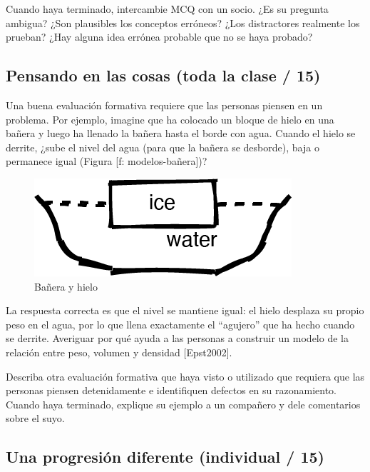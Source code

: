 \documentclass[
]{book}
\begin{document}
Cuando haya terminado, intercambie MCQ con un socio. ¿Es su pregunta ambigua? ¿Son plausibles los conceptos erróneos? ¿Los distractores realmente los prueban? ¿Hay alguna idea errónea probable que no se haya probado?

\hypertarget{pensando-en-las-cosas-toda-la-clase-15}{%
\subsection{Pensando en las cosas (toda la clase / 15)}\label{pensando-en-las-cosas-toda-la-clase-15}}

Una buena evaluación formativa requiere que las personas piensen en un problema. Por ejemplo, imagine que ha colocado un bloque de hielo en una bañera y luego ha llenado la bañera hasta el borde con agua. Cuando el hielo se derrite, ¿sube el nivel del agua (para que la bañera se desborde), baja o permanece igual (Figura {[}f: modelos-bañera{]})?

\begin{figure}
\centering
\includegraphics{./img_traning/bathtub.png}
\caption{Bañera y hielo}
\end{figure}

La respuesta correcta es que el nivel se mantiene igual: el hielo desplaza su propio peso en el agua, por lo que llena exactamente el ``agujero'' que ha hecho cuando se derrite. Averiguar por qué ayuda a las personas a construir un modelo de la relación entre peso, volumen y densidad {[}Epst2002{]}.

Describa otra evaluación formativa que haya visto o utilizado que requiera que las personas piensen detenidamente e identifiquen defectos en su razonamiento. Cuando haya terminado, explique su ejemplo a un compañero y dele comentarios sobre el suyo.

\hypertarget{una-progresiuxf3n-diferente-individual-15}{%
\subsection{Una progresión diferente (individual / 15)}\label{una-progresiuxf3n-diferente-individual-15}}
\end{document}
